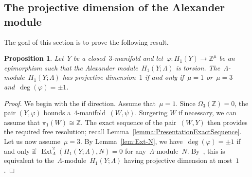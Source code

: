 \documentclass[10.9pt,a4paper]{amsart}
\newtheorem{proposition}[theorem]{Proposition}
\theoremstyle{definition}
\theoremstyle{remark}
\newcommand{\Z}{\mathbb{Z}}
\newcommand{\Ext}{\operatorname{Ext}}
\begin{document}
\color{black}

\subsection{The projective dimension of the Alexander module}
\label{sub:ProjDim}
The goal of this section is to prove the following result.

\begin{proposition}
\label{prop:NoSQP4}
Let~$Y$ be a closed~$3$-manifold and let~$\varphi \colon H_1(Y) \to \Z^\mu$ be an epimorphism such that the Alexander module~$H_1(Y;\Lambda)$  is torsion.
The~$\Lambda$-module~$H_1(Y;\Lambda)$ has projective dimension~$1$ if and only if~$\mu=1$ or~$\mu=3$ and~$\deg(\varphi)=\pm 1$.
\end{proposition}
\begin{proof}
We begin with the if direction.
Assume that~$\mu=1$.
Since $\Omega_3(\Z)=0$,  the pair $(Y,\varphi)$ bounds a~$4$-manifold~$(W,\psi)$.
Surgering $W$ if necessary, we can assume that $\pi_1(W) \cong \Z$.
The exact sequence of the pair~$(W,Y)$ then provides the required free resolution; recall Lemma~\ref{lemma:PresentationExactSequence}.
Let us now assume~$\mu=3$.
By Lemma~\ref{lem:Ext-N},  we have~$\deg(\varphi)=\pm 1$ if and only if~$\Ext^2_\Lambda(H_1(Y;\Lambda),N)=0$ for any~$\Lambda$-module~$N$. 
By~\cite[Lemma~4.1.6]{Weibel}, this is equivalent to the~$\Lambda$-module~$H_1(Y;\Lambda)$ having projective dimension at most~$1$.


\end{proof}
\end{document}
